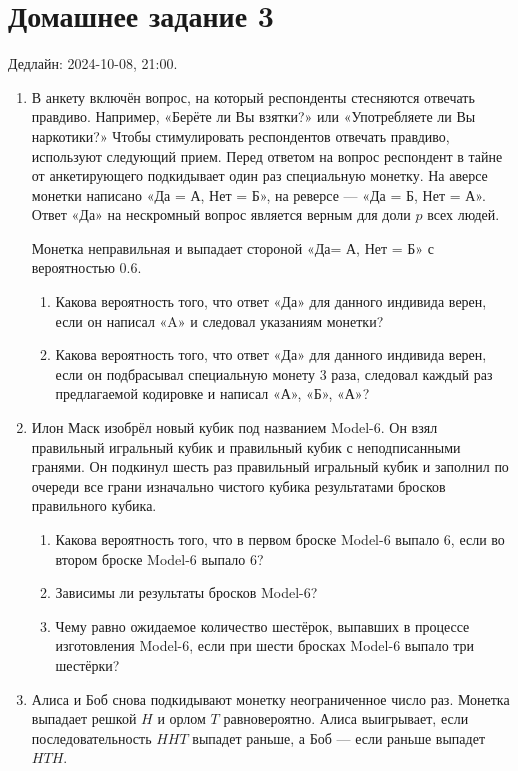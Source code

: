 \section*{Домашнее задание 3}

Дедлайн: 2024-10-08, 21:00.

\begin{enumerate}


\item В анкету включён вопрос, на который респонденты стесняются отвечать правдиво. 
Например, «Берёте ли Вы взятки?» или «Употребляете ли Вы наркотики?»
Чтобы стимулировать респондентов отвечать правдиво, используют следующий прием. 
Перед ответом на вопрос респондент в тайне от анкетирующего подкидывает один раз специальную монетку.
На аверсе монетки написано «Да = А, Нет = Б», на реверсе — «Да = Б, Нет = А». 
Ответ «Да» на нескромный вопрос является верным для доли $p$ всех людей. 

Монетка неправильная и выпадает стороной «Да= А, Нет = Б» с вероятностью $0.6$.

\begin{enumerate}
    \item Какова вероятность того, что ответ «Да» для данного индивида верен, если он написал «A» и следовал указаниям монетки?
    \item Какова вероятность того, что ответ «Да» для данного индивида верен, если он подбрасывал специальную монету 3 раза,
    следовал каждый раз предлагаемой кодировке и написал «А», «Б», «А»?
\end{enumerate}

\item Илон Маск изобрёл новый кубик под названием Model-6. 
Он взял правильный игральный кубик и правильный кубик с неподписанными гранями. 
Он подкинул шесть раз правильный игральный кубик и заполнил по очереди все грани изначально чистого кубика результатами бросков правильного кубика.
\begin{enumerate}
    \item Какова вероятность того, что в первом броске Model-6 выпало 6, если во втором броске Model-6 выпало 6?
    \item Зависимы ли результаты бросков Model-6?
    \item Чему равно ожидаемое количество шестёрок, выпавших в процессе изготовления Model-6, если при шести бросках Model-6 выпало три шестёрки?
\end{enumerate}


\item Алиса и Боб снова подкидывают монетку неограниченное число раз. 
Монетка выпадает решкой $H$ и орлом $T$ равновероятно. 
Алиса выигрывает, если последовательность $HHT$ выпадет раньше, а Боб — если раньше выпадет $HTH$.


\end{enumerate}
